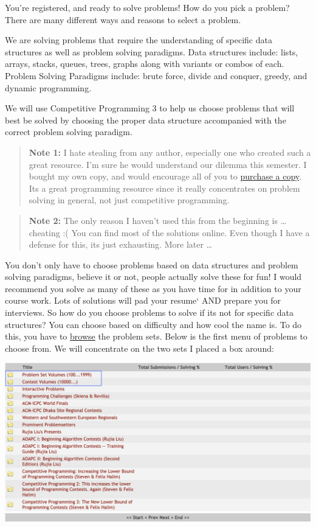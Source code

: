 You're registered, and ready to solve problems! How do you pick a
problem? There are many different ways and reasons to select a problem.

We are solving problems that require the understanding of specific data
structures as well as problem solving paradigms. Data structures
include: lists, arrays, stacks, queues, trees, graphs along with
variants or combos of each. Problem Solving Paradigms include: brute
force, divide and conquer, greedy, and dynamic programming.

We will use Competitive Programming 3 to help us choose problems that
will best be solved by choosing the proper data structure accompanied
with the correct problem solving paradigm.

\begin{quote}
\textbf{Note 1:} I hate stealing from any author, especially one who
created such a great resource. I'm sure he would understand our dilemma
this semester. I bought my own copy, and would encourage all of you to
\href{https://cpbook.net/\#CP3details}{purchase a copy}. Its a great
programming resource since it really concentrates on problem solving in
general, not just competitive programming.
\end{quote}

\begin{quote}
\textbf{Note 2:} The only reason I haven't used this from the beginning
is \ldots{} cheating :( You can find most of the solutions online. Even
though I have a defense for this, its just exhausting. More later
\ldots{}
\end{quote}

You don't only have to choose problems based on data structures and problem solving paradigms, believe it or not, people actually solve these for fun! I would recommend you solve as many of these as you have time for in addition to your course work. Lots of solutions will pad your resume` AND prepare you for interviews. So how do you choose problems to solve if its not for specific data structures? You can choose based on difficulty and how cool the name is. To do this, you have to \href{https://onlinejudge.org/index.php?option=com_onlinejudge\&Itemid=8}{browse} the problem sets. Below is the first menu of problems to choose from. We will concentrate on the two sets I placed a box around:

\begin{center}
\includegraphics[scale=.4]{images/brows_problems_sp_2020.png}
\end{center}

